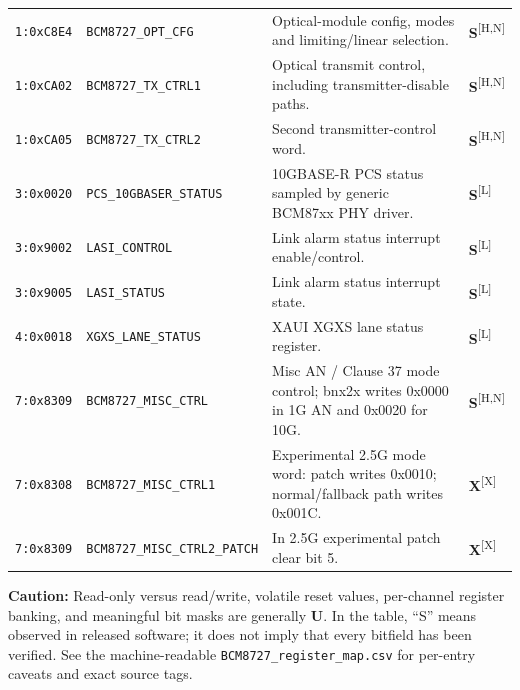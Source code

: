 \documentclass[10pt,a4paper]{article}
\newcommand{\m}[1]{\textsf{\color{blue}\bfseries #1}}
\newcommand{\unk}{\textsf{\color{amber}\bfseries U}}
\newcommand{\src}[1]{\textsuperscript{[#1]}}
\begin{document}
\begin{longtable}{@{}p{19mm}p{42mm}p{85mm}p{10mm}@{}}
\texttt{1:0xC8E4} & \texttt{BCM8727\_OPT\_CFG} & Optical-module config, modes and limiting/linear selection. & \m{S}\src{H,N} \\
\texttt{1:0xCA02} & \texttt{BCM8727\_TX\_CTRL1} & Optical transmit control, including transmitter-disable paths. & \m{S}\src{H,N} \\
\texttt{1:0xCA05} & \texttt{BCM8727\_TX\_CTRL2} & Second transmitter-control word. & \m{S}\src{H,N} \\
\texttt{3:0x0020} & \texttt{PCS\_10GBASER\_STATUS} & 10GBASE-R PCS status sampled by generic BCM87xx PHY driver. & \m{S}\src{L} \\
\texttt{3:0x9002} & \texttt{LASI\_CONTROL} & Link alarm status interrupt enable/control. & \m{S}\src{L} \\
\texttt{3:0x9005} & \texttt{LASI\_STATUS} & Link alarm status interrupt state. & \m{S}\src{L} \\
\texttt{4:0x0018} & \texttt{XGXS\_LANE\_STATUS} & XAUI XGXS lane status register. & \m{S}\src{L} \\
\texttt{7:0x8309} & \texttt{BCM8727\_MISC\_CTRL} & Misc AN / Clause 37 mode control; bnx2x writes 0x0000 in 1G AN and 0x0020 for 10G. & \m{S}\src{H,N} \\
\texttt{7:0x8308} & \texttt{BCM8727\_MISC\_CTRL1} & Experimental 2.5G mode word: patch writes 0x0010; normal/fallback path writes 0x001C. & \m{X}\src{X} \\
\texttt{7:0x8309} & \texttt{BCM8727\_MISC\_CTRL2\_PATCH} & In 2.5G experimental patch clear bit 5. & \m{X}\src{X} \\
\bottomrule
\end{longtable}
\normalsize
\textbf{Caution:} Read-only versus read/write, volatile reset values, per-channel register banking, and meaningful bit masks are generally \unk{}. In the table, ``S'' means observed in released software; it does not imply that every bitfield has been verified. See the machine-readable \texttt{BCM8727\_register\_map.csv} for per-entry caveats and exact source tags.
\end{document}
